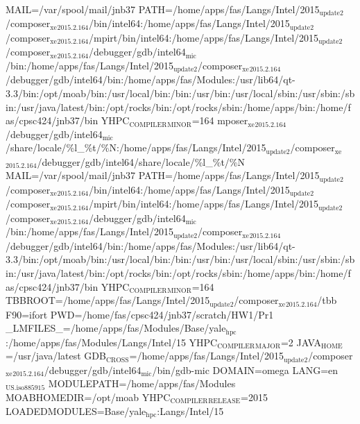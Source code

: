 \documentclass[11pt]{article}
\begin{document}
MAIL=/var/spool/mail/jnb37
PATH=/home/apps/fas/Langs/Intel/2015\(_{\text{update2}}\)/composer\(_{\text{xe}}\)\(_{\text{2015.2.164}}\)/bin/intel64:/home/apps/fas/Langs/Intel/2015\(_{\text{update2}}\)/composer\(_{\text{xe}}\)\(_{\text{2015.2.164}}\)/mpirt/bin/intel64:/home/apps/fas/Langs/Intel/2015\(_{\text{update2}}\)/composer\(_{\text{xe}}\)\(_{\text{2015.2.164}}\)/debugger/gdb/intel64\(_{\text{mic}}\)/bin:/home/apps/fas/Langs/Intel/2015\(_{\text{update2}}\)/composer\(_{\text{xe}}\)\(_{\text{2015.2.164}}\)/debugger/gdb/intel64/bin:/home/apps/fas/Modules:/usr/lib64/qt-3.3/bin:/opt/moab/bin:/usr/local/bin:/bin:/usr/bin:/usr/local/sbin:/usr/sbin:/sbin:/usr/java/latest/bin:/opt/rocks/bin:/opt/rocks/sbin:/home/apps/bin:/home/fas/cpsc424/jnb37/bin
YHPC\(_{\text{COMPILER}}\)\(_{\text{MINOR}}\)=164
mposer\(_{\text{xe}}\)\(_{\text{2015.2.164}}\)/debugger/gdb/intel64\(_{\text{mic}}\)/share/locale/\%l\_\%t/\%N:/home/apps/fas/Langs/Intel/2015\(_{\text{update2}}\)/composer\(_{\text{xe}}\)\(_{\text{2015.2.164}}\)/debugger/gdb/intel64/share/locale/\%l\_\%t/\%N
MAIL=/var/spool/mail/jnb37
PATH=/home/apps/fas/Langs/Intel/2015\(_{\text{update2}}\)/composer\(_{\text{xe}}\)\(_{\text{2015.2.164}}\)/bin/intel64:/home/apps/fas/Langs/Intel/2015\(_{\text{update2}}\)/composer\(_{\text{xe}}\)\(_{\text{2015.2.164}}\)/mpirt/bin/intel64:/home/apps/fas/Langs/Intel/2015\(_{\text{update2}}\)/composer\(_{\text{xe}}\)\(_{\text{2015.2.164}}\)/debugger/gdb/intel64\(_{\text{mic}}\)/bin:/home/apps/fas/Langs/Intel/2015\(_{\text{update2}}\)/composer\(_{\text{xe}}\)\(_{\text{2015.2.164}}\)/debugger/gdb/intel64/bin:/home/apps/fas/Modules:/usr/lib64/qt-3.3/bin:/opt/moab/bin:/usr/local/bin:/bin:/usr/bin:/usr/local/sbin:/usr/sbin:/sbin:/usr/java/latest/bin:/opt/rocks/bin:/opt/rocks/sbin:/home/apps/bin:/home/fas/cpsc424/jnb37/bin
YHPC\(_{\text{COMPILER}}\)\(_{\text{MINOR}}\)=164
TBBROOT=/home/apps/fas/Langs/Intel/2015\(_{\text{update2}}\)/composer\(_{\text{xe}}\)\(_{\text{2015.2.164}}\)/tbb
F90=ifort
PWD=/home/fas/cpsc424/jnb37/scratch/HW1/Pr1
\_LMFILES\_=/home/apps/fas/Modules/Base/yale\(_{\text{hpc}}\):/home/apps/fas/Modules/Langs/Intel/15
YHPC\(_{\text{COMPILER}}\)\(_{\text{MAJOR}}\)=2
JAVA\(_{\text{HOME}}\)=/usr/java/latest
GDB\(_{\text{CROSS}}\)=/home/apps/fas/Langs/Intel/2015\(_{\text{update2}}\)/composer\(_{\text{xe}}\)\(_{\text{2015.2.164}}\)/debugger/gdb/intel64\(_{\text{mic}}\)/bin/gdb-mic
DOMAIN=omega
LANG=en\(_{\text{US.iso885915}}\)
MODULEPATH=/home/apps/fas/Modules
MOABHOMEDIR=/opt/moab
YHPC\(_{\text{COMPILER}}\)\(_{\text{RELEASE}}\)=2015
LOADEDMODULES=Base/yale\(_{\text{hpc}}\):Langs/Intel/15
\end{document}
